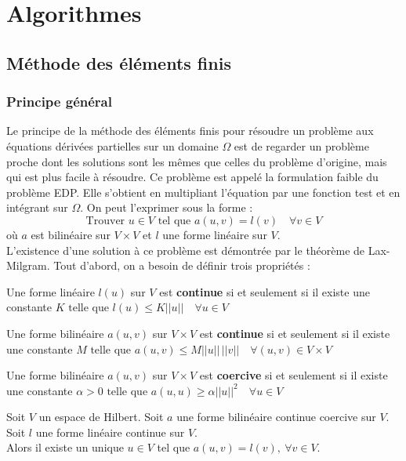 \chapter{Algorithmes}

\section{Méthode des éléments finis}
\subsection{Principe général}
\label{eltfinis}
Le principe de la méthode des éléments finis pour résoudre un problème aux équations dérivées partielles sur un domaine $\Omega$ est de regarder un problème proche dont les solutions sont les mêmes que celles du problème d'origine, mais qui est plus facile à résoudre. Ce problème est appelé la formulation faible du problème EDP. Elle s'obtient en multipliant l'équation par une fonction test et en intégrant sur $\Omega$. On peut l'exprimer sous la forme :
\[ \mbox{Trouver } u \in V \mbox{ tel que } a(u,v)=l(v)\quad \forall v\in V \]
où $a$ est bilinéaire sur $V\times V$ et $l$ une forme linéaire sur $V$.\\

L'existence d'une solution à ce problème est démontrée par le théorème de Lax-Milgram. Tout d'abord, on a besoin de définir trois propriétés :
\begin{mydef}
Une forme linéaire $l(u)$ sur $V$ est {\bf continue} si et seulement si il existe une constante $K \mbox{ telle que } l(u)\leq K||u||\quad \forall u\in V$
\end{mydef}
\begin{mydef}
Une forme bilinéaire $a(u,v)$ sur $V\times V$ est {\bf continue} si et seulement si il existe une constante $M \mbox{ telle que } a(u,v)\leq M||u||\,||v||\quad \forall (u,v)\in V\times V$
\end{mydef}
\begin{mydef}
Une forme bilinéaire $a(u,v)$ sur $V\times V$ est {\bf coercive} si et seulement si il existe une constante $\alpha>0 \mbox{ telle que } a(u,u)\geq \alpha ||u||^2\quad \forall u\in V$
\end{mydef}

\begin{thm}
Soit $V$ un espace de Hilbert. Soit $a$ une forme bilinéaire continue coercive sur $V$. Soit $l$ une forme linéaire continue sur $V$.\\
Alors il existe un unique $u\in V$ tel que $a(u,v)=l(v),\ \forall v\in V$.\\
\end{thm}


